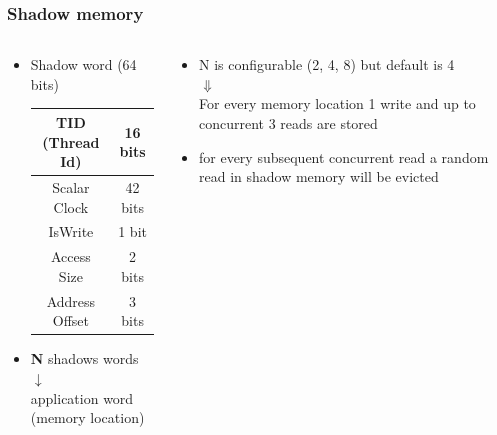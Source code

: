 \documentclass[xcolor=dvipsnames]{beamer}
\begin{document}
	\begin{frame}[fragile]
		\frametitle{Shadow memory}
		\begin{columns}[t]
			\begin{column}{0.5\textwidth}
				\begin{itemize}[<+->]
					\item Shadow word (64 bits)\\\vspace{0.5em}
					\begin{tabular}{| c | c |}
						\hline
						TID (Thread Id) & 16 bits \\
						\hline
						Scalar Clock & 42 bits \\
						\hline
						IsWrite & 1 bit \\
						\hline
						Access Size & 2 bits \\
						\hline
						Address Offset & 3 bits \\
						\hline
					\end{tabular}
					\vspace{1em}
					\item \textbf{N} shadows words\\ \hspace{3em}$\downarrow$\\ application word (memory location)
				\end{itemize}
			\end{column}
			\begin{column}{0.5\textwidth}
				\begin{itemize}[<+->]
					\item N is configurable (2, 4, 8) but default is 4 \\\hspace{5em}$\Downarrow$\\For every memory location 1 write and up to concurrent 3 reads are stored
					\item for every subsequent concurrent read a random read in shadow memory will be evicted
				\end{itemize}
			\end{column}
		\end{columns}
	\end{frame}
	
\end{document}
